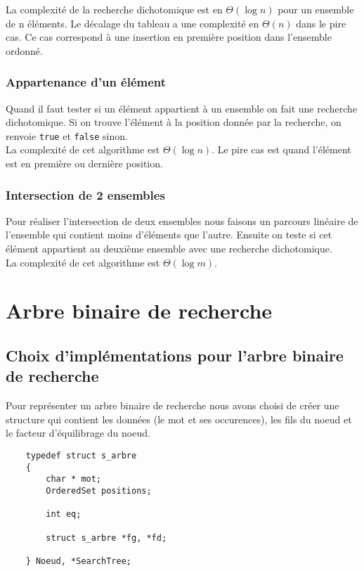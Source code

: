 \documentclass{article}
\begin{document}
        La complexité de la recherche dichotomique est en $\Theta(\log{}n)$ pour
        un ensemble de n éléments. Le décalage du tableau a une complexité en
        $\Theta(n)$ dans le pire cas. Ce cas correspond à une insertion
        en première position dans l'ensemble ordonné.

        \subsubsection{Appartenance d'un élément}
        Quand il faut tester si un élément appartient à un ensemble on fait
        une recherche dichotomique. Si on trouve l'élément à la position donnée
        par la recherche, on renvoie \texttt{true} et \texttt{false} sinon.\\

        La complexité de cet algorithme est $\Theta(\log{}n)$. Le pire cas
        est quand l'élément est en première ou dernière position.

        \subsubsection{Intersection de 2 ensembles}
        Pour réaliser l'intersection de deux ensembles nous faisons un parcours
        linéaire de l'ensemble qui contient moins d'éléments que l'autre. Ensuite
        on teste si cet élément appartient au deuxième ensemble avec une
        recherche dichotomique.\\

        La complexité de cet algorithme est $\Theta(\log{}m)$.


\section{Arbre binaire de recherche}

    \subsection{Choix d'implémentations pour l'arbre binaire de recherche}
    Pour représenter un arbre binaire de recherche nous avons choisi de créer
    une structure qui contient les données (le mot et ses occurences), les fils
    du noeud et le facteur d'équilibrage du noeud.

    \begin{verbatim}
    typedef struct s_arbre
    {
        char * mot;
        OrderedSet positions;

        int eq;

        struct s_arbre *fg, *fd;

    } Noeud, *SearchTree;
    \end{verbatim}
\end{document}
